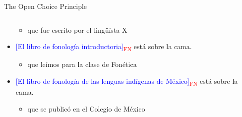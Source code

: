 \documentclass{beamer}
\begin{document}
\begin{frame}{The Open Choice Principle}
\begin{columns}
\begin{column}{6cm}
\begin{itemize}
\begin{itemize}
            \item que fue escrito por el lingüísta X
        \end{itemize}
        \item \textcolor{blue}{{[El libro de fonología introductoria]}}\textcolor{red}{\textsubscript{FN}} está sobre la cama.
        \begin{itemize}
            \item que leímos para la clase de Fonética
        \end{itemize}
        \item \textcolor{blue}{{[El libro de fonología de las lenguas indígenas de México]}}\textcolor{red}{\textsubscript{FN}} está sobre la cama.
        \begin{itemize}
            \item que se publicó en el Colegio de México
        \end{itemize}
        \end{itemize}
        \end{column}
    \end{columns}
\end{frame}
\end{document}
